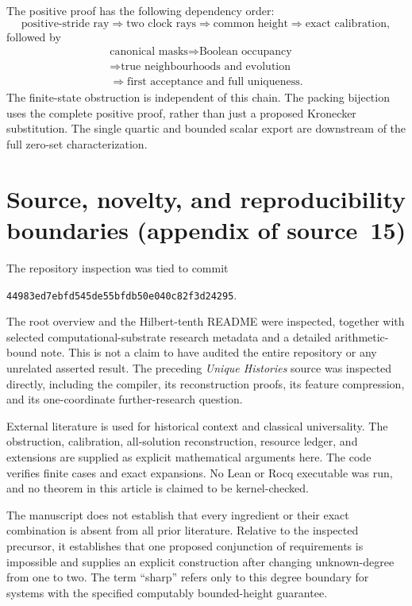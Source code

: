 \documentclass[11pt,letterpaper]{article}
\numberwithin{equation}{section}
\theoremstyle{definition}
\begin{document}
The positive proof has the following dependency order:
\[
 \text{positive-stride ray}
 \Longrightarrow \text{two clock rays}
 \Longrightarrow \text{common height}
 \Longrightarrow \text{exact calibration},
\]
followed by
\[
 \begin{gathered}
 \text{canonical masks} \Longrightarrow \text{Boolean occupancy}\\
 \Longrightarrow \text{true neighbourhoods and evolution}\\
 \Longrightarrow \text{first acceptance and full uniqueness}.
 \end{gathered}
\]
The finite-state obstruction is independent of this chain. The packing
bijection uses the complete positive proof, rather than just a proposed
Kronecker substitution. The single quartic and bounded scalar export
are downstream of the full zero-set characterization.

\section{Source, novelty, and reproducibility boundaries (appendix of source~15)}\label{pwh:oc:app:trust}

The repository inspection was tied to commit
\begin{center}
\small\texttt{44983ed7ebfd545de55bfdb50e040c82f3d24295}.
\end{center}
The root overview and the Hilbert-tenth README were inspected, together
with selected computational-substrate research metadata and a detailed
arithmetic-bound note. This is not a claim to have audited the entire
repository or any unrelated asserted result. The preceding
\emph{Unique Histories} source was inspected directly, including the
compiler, its reconstruction proofs, its feature compression, and its
one-coordinate further-research question.

External literature is used for historical context and classical
universality. The obstruction, calibration, all-solution reconstruction,
resource ledger, and extensions are supplied as explicit mathematical
arguments here. The code verifies finite cases and exact expansions.
No Lean or Rocq executable was run, and no theorem in this article is
claimed to be kernel-checked.

The manuscript does not establish that every ingredient or their exact
combination is absent from all prior literature. Relative to the inspected precursor, it establishes that
one proposed conjunction of requirements is impossible and supplies an
explicit construction after changing unknown-degree from one to two.
The term ``sharp'' refers only to this degree boundary for systems with
the specified computably bounded-height guarantee.
\end{document}
